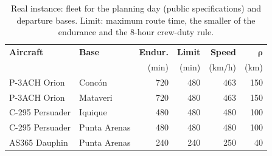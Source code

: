 \begin{table}[!ht]
\centering
\caption{Real instance: fleet for the planning day (public specifications) and departure bases. Limit: maximum route time, the smaller of the endurance and the 8-hour crew-duty rule.\label{tab7}}
\footnotesize\setlength{\tabcolsep}{3pt}
\begin{tabular*}{\columnwidth}{@{\extracolsep\fill}llrrrr@{\extracolsep\fill}}
\toprule
\textbf{Aircraft} & \textbf{Base} & \textbf{Endur.} & \textbf{Limit} & \textbf{Speed} & $\boldsymbol{\rho}$ \\
 & & (min) & (min) & (km/h) & (km) \\
\midrule
P-3ACH Orion & Conc\'on & 720 & 480 & 463 & 150 \\
P-3ACH Orion & Mataveri & 720 & 480 & 463 & 150 \\
C-295 Persuader & Iquique & 480 & 480 & 480 & 100 \\
C-295 Persuader & Punta Arenas & 480 & 480 & 480 & 100 \\
AS365 Dauphin & Punta Arenas & 240 & 240 & 250 & 40 \\
\bottomrule
\end{tabular*}
\end{table}
